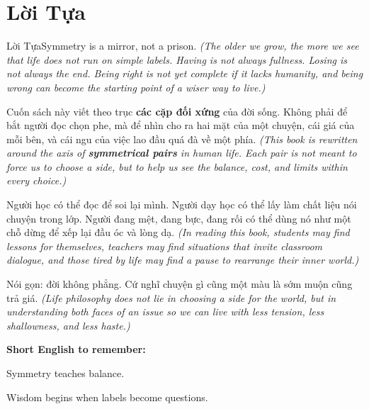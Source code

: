 \chapter*{Lời Tựa}

\begin{truyen}{Lời Tựa}{Symmetry is a mirror, not a prison.}
\textit{(The older we grow, the more we see that life does not run on simple labels. Having is not always fullness. Losing is not always the end. Being right is not yet complete if it lacks humanity, and being wrong can become the starting point of a wiser way to live.)}

Cuốn sách này viết theo trục \textbf{các cặp đối xứng} của đời sống. Không phải để bắt người đọc chọn phe, mà để nhìn cho ra hai mặt của một chuyện, cái giá của mỗi bên, và cái ngu của việc lao đầu quá đà về một phía.
\textit{(This book is rewritten around the axis of \textbf{symmetrical pairs} in human life. Each pair is not meant to force us to choose a side, but to help us see the balance, cost, and limits within every choice.)}

Người học có thể đọc để soi lại mình. Người dạy học có thể lấy làm chất liệu nói chuyện trong lớp. Người đang mệt, đang bực, đang rối có thể dùng nó như một chỗ dừng để xếp lại đầu óc và lòng dạ.
\textit{(In reading this book, students may find lessons for themselves, teachers may find situations that invite classroom dialogue, and those tired by life may find a pause to rearrange their inner world.)}
\end{truyen}

\begin{baihoc}
Nói gọn: đời không phẳng. Cứ nghĩ chuyện gì cũng một màu là sớm muộn cũng trả giá.
\textit{(Life philosophy does not lie in choosing a side for the world, but in understanding both faces of an issue so we can live with less tension, less shallowness, and less haste.)}
\end{baihoc}

\begin{ghinhoanh}
\textbf{Short English to remember:}

Symmetry teaches balance.

Wisdom begins when labels become questions.
\end{ghinhoanh}

